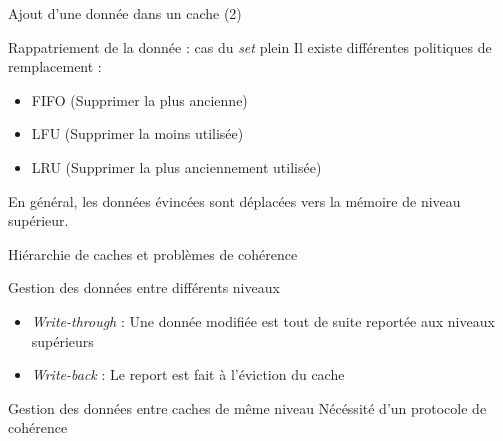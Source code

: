\begin{frame}{Ajout d'une donnée dans un cache (2)}
  \begin{block}{Rappatriement de la donnée : cas du \emph{set} plein}
    Il existe différentes politiques de remplacement :
    \begin{itemize}
    \item{FIFO (Supprimer la plus ancienne)}
    \item{LFU (Supprimer la moins utilisée)}
    \item{LRU (Supprimer la plus anciennement utilisée)}
    \end{itemize}
    En général, les données évincées sont déplacées vers la mémoire de niveau supérieur.
  \end{block}
\end{frame}


\begin{frame}{Hiérarchie de caches et problèmes de cohérence}
  \begin{block}{Gestion des données entre différents niveaux}
    \begin{itemize}
    \item{\emph{Write-through} : Une donnée modifiée est tout de suite reportée aux niveaux supérieurs}
    \item{\emph{Write-back} : Le report est fait à l'éviction du cache}
    \end{itemize}
  \end{block}
  \begin{block}{Gestion des données entre caches de même niveau}
    Nécéssité d'un protocole de cohérence
  \end{block}
\end{frame}
